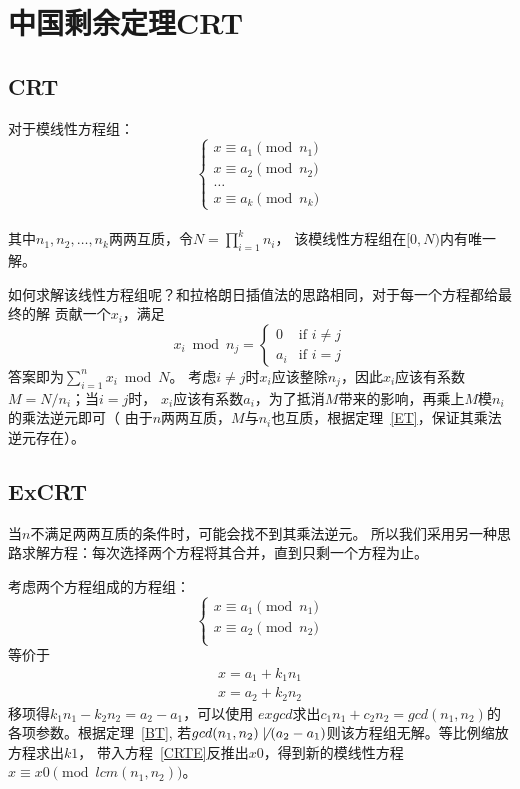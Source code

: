 \section{中国剩余定理CRT}
\subsection{CRT}
\begin{theorem}
    对于模线性方程组：
    \begin{displaymath}
        \left\{\begin{array}{l}
            x \equiv a_1 \pmod{n_1}\\
            x \equiv a_2 \pmod{n_2}\\
            \ldots\\
            x \equiv a_k \pmod{n_k}
        \end{array}\right.
    \end{displaymath}\\
    其中$n_1,n_2,\ldots,n_k$两两互质，令$N=\prod_{i=1}^k{n_i}$，
    该模线性方程组在$[0,N)$内有唯一解。
\end{theorem}
如何求解该线性方程组呢？和拉格朗日插值法的思路相同，对于每一个方程都给最终的解
贡献一个$x_i$，满足
\begin{displaymath}
x_i \bmod n_j =
\left\{\begin{array}{ll}
0 & \textrm{if $i\neq j$}\\
a_i & \textrm{if $i=j$}
\end{array}\right.
\end{displaymath}
答案即为$\sum_{i=1}^n{x_i} \bmod N$。
考虑$i\neq j$时$x_i$应该整除$n_j$，因此$x_i$应该有系数$M=N/n_i$；当$i=j$时，
$x_i$应该有系数$a_i$，为了抵消$M$带来的影响，再乘上$M$模$n_i$的乘法逆元即可（
由于$n$两两互质，$M$与$n_i$也互质，根据定理~\ref{ET}，保证其乘法逆元存在）。
\subsection{ExCRT}
当$n$不满足两两互质的条件时，可能会找不到其乘法逆元。
所以我们采用另一种思路求解方程：每次选择两个方程将其合并，直到只剩一个方程为止。

考虑两个方程组成的方程组：
\begin{displaymath}
    \left\{\begin{array}{l}
        x \equiv a_1 \pmod{n_1}\\
        x \equiv a_2 \pmod{n_2}\\
    \end{array}\right.
\end{displaymath}
等价于
\begin{eqnarray}
    x=a_1+k_1n_1\label{CRTE}\\
    x=a_2+k_2n_2
\end{eqnarray}
移项得$k_1n_1-k_2n_2=a_2-a_1$，可以使用
$exgcd$求出$c_1n_1+c_2n_2=gcd(n_1,n_2)$的各项参数。根据定理~\ref{BT},
若$gcd(n_1,n_2)\not\mid(a_2-a_1)$则该方程组无解。等比例缩放方程求出$k1$，
带入方程~\ref{CRTE}反推出$x0$，得到新的模线性方程$x \equiv x0
\pmod{lcm(n_1,n_2)}$。
